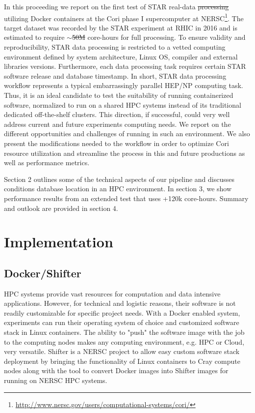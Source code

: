\documentclass[a4paper]{jpconf}
\providecommand{\DIFaddtex}[1]{{\protect\color{blue}\uwave{#1}}} %
\providecommand{\DIFdeltex}[1]{{\protect\color{red}\sout{#1}}}                      %
\providecommand{\DIFaddbegin}{} %
\providecommand{\DIFaddend}{} %
\providecommand{\DIFdelbegin}{} %
\providecommand{\DIFdelend}{} %
\providecommand{\DIFadd}[1]{\texorpdfstring{\DIFaddtex{#1}}{#1}} %
\providecommand{\DIFdel}[1]{\texorpdfstring{\DIFdeltex{#1}}{}} %
\newcommand{\DIFscaledelfig}{0.5}
\newlength{\DIFdelgraphicswidth} %
\newlength{\DIFdelgraphicsheight} %
\newcommand{\DIFaddincludegraphics}[2][]{{\color{blue}\fbox{\DIFOincludegraphics[#1]{#2}}}} %
\newcommand{\DIFdelincludegraphics}[2][]{%
\sbox{\DIFdelgraphicsbox}{\DIFOincludegraphics[#1]{#2}}%
\settoboxwidth{\DIFdelgraphicswidth}{\DIFdelgraphicsbox} %
\settoboxtotalheight{\DIFdelgraphicsheight}{\DIFdelgraphicsbox} %
\scalebox{\DIFscaledelfig}{%
\parbox[b]{\DIFdelgraphicswidth}{\usebox{\DIFdelgraphicsbox}\\[-\baselineskip] \rule{\DIFdelgraphicswidth}{0em}}\llap{\resizebox{\DIFdelgraphicswidth}{\DIFdelgraphicsheight}{%
\setlength{\unitlength}{\DIFdelgraphicswidth}%
\begin{picture}(1,1)%
\thicklines\linethickness{2pt} %
{\color[rgb]{1,0,0}\put(0,0){\framebox(1,1){}}}%
{\color[rgb]{1,0,0}\put(0,0){\line( 1,1){1}}}%
{\color[rgb]{1,0,0}\put(0,1){\line(1,-1){1}}}%
\end{picture}%
}\hspace*{3pt}}} %
} %
\DeclareRobustCommand{\DIFaddbegin}{\DIFOaddbegin \let\includegraphics\DIFaddincludegraphics} %
\DeclareRobustCommand{\DIFaddend}{\DIFOaddend \let\includegraphics\DIFOincludegraphics} %
\DeclareRobustCommand{\DIFdelbegin}{\DIFOdelbegin \let\includegraphics\DIFdelincludegraphics} %
\DeclareRobustCommand{\DIFdelend}{\DIFOaddend \let\includegraphics\DIFOincludegraphics} %
\begin{document}
In this proceeding we report on the first test of STAR real-data \DIFdelbegin \DIFdel{processing
}\DIFdelend \DIFaddbegin \DIFadd{reconstruction
}\DIFaddend utilizing Docker \cite{docker} containers at the Cori phase I supercomputer at
NERSC\footnote{\url{http://www.nersc.gov/users/computational-systems/cori/}}. The
target dataset was recorded by the STAR experiment at RHIC in 2016
and is estimated to require $\sim$\DIFdelbegin \DIFdel{50M }\DIFdelend \DIFaddbegin \DIFadd{50 M }\DIFaddend core-hours for full processing. To ensure
validity and reproducibility, STAR data processing is restricted to a vetted
computing environment defined by system architecture, Linux OS, compiler and
external libraries versions.  Furthermore, each data processing task requires
certain STAR software release and database timestamp. In short, STAR data
processing workflow represents a typical embarrassingly parallel HEP/NP
computing task.  Thus, it is an ideal candidate to test the suitability of
running containerized software, normalized to run on a shared HPC systems
instead of its traditional dedicated off-the-shelf clusters. This direction, if
successful, could very well address current and future experiments computing
needs. We report on the different opportunities and challenges of running in
such an environment.  We also present the modifications needed to the workflow
in order to optimize Cori resource utilization and streamline the process in
this and future productions as well as performance metrics.

Section 2 outlines some of the technical aspects of our pipeline and discusses
conditions database location in an HPC environment. In section 3,
we show performance results from an extended test that uses +120k core-hours.
Summary and outlook are provided in section 4. 

\section{Implementation}
\subsection{Docker/Shifter}
HPC systems provide vast resources for computation and data intensive
applications. However, for technical and logistic reasons, their software is
not readily customizable for specific project needs. With a Docker enabled
system, experiments can run their operating system of choice  and customized
software stack in Linux containers.  The ability to "push" the software image
with the job to the computing nodes makes any computing environment, e.g. HPC
or Cloud, very versatile. Shifter \cite{shifter} is a NERSC project \DIFaddbegin \DIFadd{created }\DIFaddend to
allow easy custom software stack deployment by bringing the functionality of
Linux containers to Cray compute nodes along with the tool to convert Docker
images into Shifter images for running on NERSC HPC systems.
\end{document}
